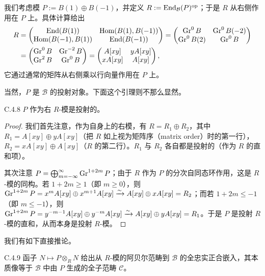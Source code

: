 我们考虑模 $P:=B(1)\oplus B(-1)$，并定义 $R:=\operatorname{End}_{\mathcal B}(P)^{\mathrm{op}}$；于是 $R$ 从右侧作用在 $P$ 上。具体计算给出
{\small
\[
\begin{aligned}
R&=\begin{pmatrix}\operatorname{End}(B(1))&\operatorname{Hom}(B(1),B(-1))\\\operatorname{Hom}(B(-1),B(1))&\operatorname{End}(B(-1))\end{pmatrix}
=\begin{pmatrix}\operatorname{Gr}^0B&\operatorname{Gr}^0B(-2)\\\operatorname{Gr}^0B(2)&\operatorname{Gr}^0B\end{pmatrix}\\
&=\begin{pmatrix}\operatorname{Gr}^0B&\operatorname{Gr}^{-2}B\\\operatorname{Gr}^2B&\operatorname{Gr}^0B\end{pmatrix}
=\begin{pmatrix}A[xy]&yA[xy]\\xA[xy]&A[xy]\end{pmatrix},
\end{aligned}
\]}
它通过通常的矩阵从右侧乘以行向量作用在 $P$ 上。

当然，$P$ 是 $\mathcal B$ 的投射对象。下面这个引理则不那么显然。

\begin{lem}{C.4.8}\label{thm:a4-19-13}
$P$ 作为右 $R$-模是投射的。
\end{lem}

\begin{proof}
我们首先注意，作为自身上的右模，有 $R=R_1\oplus R_2$，其中 $R_1=A[xy]\oplus yA[xy]$（把 $R$ 如上视为矩阵序（matrix order）时的第一行），$R_2=xA[xy]\oplus A[xy]$（$R$ 的第二行）。$R_1$ 与 $R_2$ 各自都是投射的（作为 $R$ 的直和项）。

其次注意 $P=\bigoplus_{m=-\infty}^{\infty}\operatorname{Gr}^{1+2m}P$；由于 $R$ 作为 $P$ 的分次自同态环作用，这是 $R$-模的同构。若 $1+2m\ge1$（即 $m\ge0$），则 $\operatorname{Gr}^{1+2m}P=x^mA[xy]\oplus x^{m+1}A[xy]\xrightarrow{\sim}A[xy]\oplus xA[xy]=R_2$；而若 $1+2m\le-1$（即 $m\le-1$），则 $\operatorname{Gr}^{1+2m}P=y^{-m-1}A[xy]\oplus y^{-m}A[xy]\xrightarrow{\sim}A[xy]\oplus yA[xy]=R_1$。于是 $P$ 是投射 $R$-模的直和，从而本身是投射 $R$-模。
\end{proof}

我们有如下直接推论。

\begin{prop}{C.4.9}\label{thm:a4-19-14}
函子 $N\mapsto P\otimes_R N$ 给出从 $R$-模的阿贝尔范畴到 $\mathcal B$ 的全忠实正合嵌入，其本质像等于 $\mathcal B$ 中由 $P$ 生成的全子范畴 $\mathcal C$。
\end{prop}

